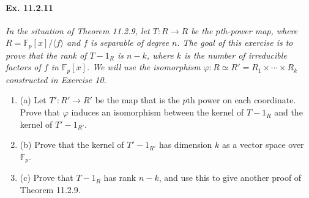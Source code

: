\documentclass[11pt,a4paper]{article}
\newcommand{\be} {\begin{enumerate}}
\newcommand{\ee} {\end{enumerate}}
\newcommand{\F}{\mathbb{F}}
\begin{document}
\paragraph{Ex. 11.2.11}

{\it In the situation of Theorem 11.2.9, let $T:R \to R$ be the $p$th-power map, where $R = \F_p[x]/\langle f \rangle$ and $f$ is separable of degree $n$. The goal of this exercise is to prove that the rank of $T - 1_R$ is $n-k$, where $k$ is the number of irreducible factors of $f$ in $\F_p[x]$. We will use the isomorphism 
$\varphi:R \simeq R' = R_1\times \cdots \times R_k$ constructed in Exercise 10.
\be
\item[(a)] Let $T' : R' \to R'$ be the map that is the $p$th power on each coordinate. Prove that $\varphi$ induces an isomorphism between the kernel of $T -1_R$ and the kernel of $T'-1_{R'}$.

\item[(b)] Prove that the kernel of $T'-1_{R'}$ has dimension $k$ as a vector space over $\F_p$.

\item[(c)] Prove that $T-1_R$ has rank $n-k$, and use this to give another proof of Theorem 11.2.9.
\ee
}
\end{document}

